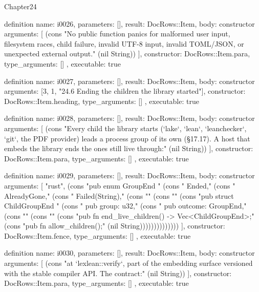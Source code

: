 \begin{lexlean}{Chapter24}
\begin{semanticmodule}
definition{
  name: i0026,
  parameters: [],
  result: DocRows::Item,
  body: constructor{
    arguments: [
      (cons "No public function panics for malformed user input, filesystem races, child failure, invalid UTF-8 input, invalid TOML/JSON, or unexpected external output." (nil String))
    ],
    constructor: DocRows::Item.para,
    type_arguments: []
  },
  executable: true
}

definition{
  name: i0027,
  parameters: [],
  result: DocRows::Item,
  body: constructor{
    arguments: [3, 1, "24.6 Ending the children the library started"],
    constructor: DocRows::Item.heading,
    type_arguments: []
  },
  executable: true
}

definition{
  name: i0028,
  parameters: [],
  result: DocRows::Item,
  body: constructor{
    arguments: [
      (cons "Every child the library starts (`lake`, `lean`, `leanchecker`, `git`, the PDF provider) leads a process group of its own (§17.17). A host that embeds the library ends the ones still live through:" (nil String))
    ],
    constructor: DocRows::Item.para,
    type_arguments: []
  },
  executable: true
}

definition{
  name: i0029,
  parameters: [],
  result: DocRows::Item,
  body: constructor{
    arguments: [
      "rust",
      (cons "pub enum GroupEnd {" (cons "    Ended," (cons "    AlreadyGone," (cons "    Failed(String)," (cons "}" (cons "" (cons "pub struct ChildGroupEnd {" (cons "    pub group: u32," (cons "    pub outcome: GroupEnd," (cons "}" (cons "" (cons "pub fn end_live_children() -> Vec<ChildGroupEnd>;" (cons "pub fn allow_children();" (nil String))))))))))))))
    ],
    constructor: DocRows::Item.fence,
    type_arguments: []
  },
  executable: true
}

definition{
  name: i0030,
  parameters: [],
  result: DocRows::Item,
  body: constructor{
    arguments: [
      (cons "at `lexlean::verify`, part of the embedding surface versioned with the stable compiler API. The contract:" (nil String))
    ],
    constructor: DocRows::Item.para,
    type_arguments: []
  },
  executable: true
}


\end{semanticmodule}
\end{lexlean}

